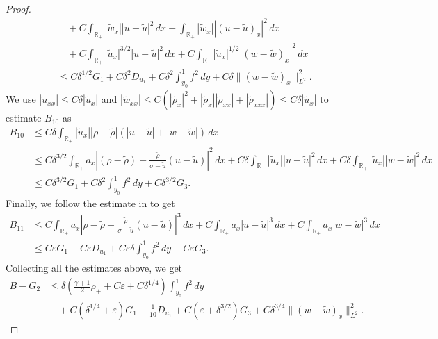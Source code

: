\documentclass[11pt,reqno]{amsart}
\numberwithin{equation}{section} %
\newcommand{\R}{\mathbb{R}}
\newcommand{\e}{\varepsilon}
\begin{document}
\begin{proof}
\begin{align*}
	&\quad + C\int_{\R_+}|\tilde{w}_x||u-\tilde{u}|^2\,dx +\int_{\R_+}|\tilde{w}_x||(u-\tilde{u})_x|^2\,dx \\
    &\quad +C\int_{\R_+}|\tilde{u}_x|^{3/2}|u-\tilde{u}|^2\,dx +C\int_{\R_+}|\tilde{u}_x|^{1/2}|(w-\tilde{w})_x|^2\,dx\\
	&\le C\delta^{1/2}G_1 + C\delta^2D_{u_1}+C\delta^{2}\int_{y_0}^1f^2\,dy + C\delta \|(w-\tilde{w})_x\|_{L^2}^2.
\end{align*}
	We use $|\tilde{u}_{xx}|\le C\delta |\tilde{u}_x|$ and $|\tilde{w}_{xx}|\le C(|\tilde{\rho}_x|^2+|\tilde{\rho}_x||\tilde{\rho}_{xx}|+|\tilde{\rho}_{xxx}|)\le C\delta |\tilde{u}_x|$ to estimate $B_{10}$ as
\begin{align*}
	B_{10}%
	&\le C\delta\int_{\R_+}|\tilde{u}_x||\rho-\tilde{\rho}|(|u-\tilde{u}|+|w-\tilde{w}|)\,dx\\
	&\le C\delta^{3/2}\int_{\R_+}a_x\left|(\rho-\tilde{\rho})-\frac{\tilde{\rho}}{\sigma-\tilde{u}}(u-\tilde{u})\right|^2\,dx + C\delta\int_{\R_+}|\tilde{u}_x||u-\tilde{u}|^2\,dx+C\delta\int_{\R_+}|\tilde{u}_x||w-\tilde{w}|^2\,dx\\
	&\le C\delta^{3/2}G_1 + C\delta^2\int_{y_0}^1f^2\,dy+C\delta^{3/2}G_3.
\end{align*}
Finally, we follow the estimate in \cite[Lemma 4.5]{KOW25} to get
\begin{align*}
	B_{11}&\le C\int_{\R_+}a_x\left|\rho-\tilde{\rho}-\frac{\tilde{\rho}}{\sigma-\tilde{u}}(u-\tilde{u})\right|^3\,dx + C\int_{\R_+}a_x|u-\tilde{u}|^3\,dx +C\int_{\R_+}a_x|w-\tilde{w}|^3\,dx\\
	&\le C\varepsilon G_1 + C\varepsilon D_{u_1}+C\varepsilon\delta\int_{y_0}^1f^2\,dy+C\e G_3.%
\end{align*}
Collecting all the estimates above, we get
\begin{equation} \label{est-B}
\begin{aligned}
    B -G_2 &\le \delta\left(\frac{\gamma+1}{2}\rho_++C\varepsilon+C\delta^{1/4}\right)\int_{y_0}^1f^2\,dy\\
    &\quad +C(\delta^{1/4}+\varepsilon)G_1 +\frac{1}{10}D_{u_1}+C(\e + \delta^{3/2})G_3%
    +C\delta^{3/4}\|(w-\tilde{w})_x\|_{L^2}^2.
\end{aligned}
\end{equation}


\end{proof}
\end{document}
